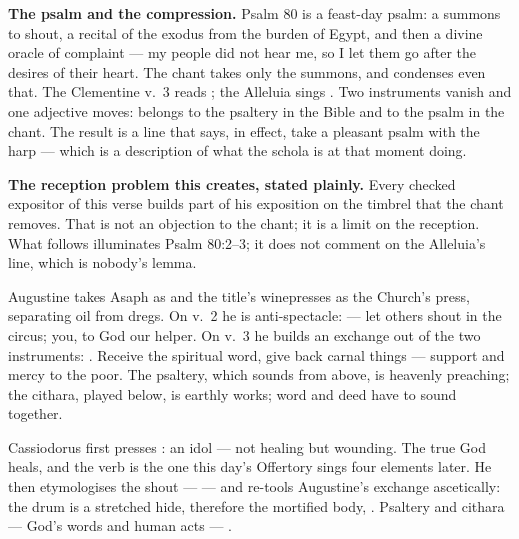 \textbf{The psalm and the compression.} Psalm 80 is a feast-day psalm: a
summons to shout, a recital of the exodus from the burden of Egypt, and then a
divine oracle of complaint --- my people did not hear me, so I let them go
after the desires of their heart. The chant takes only the summons, and
condenses even that. The Clementine v.~3 reads ; the Alleluia sings . Two instruments vanish and one adjective moves:
 belongs to the psaltery in the Bible and to the psalm in the
chant. The result is a line that says, in effect, take a pleasant psalm with
the harp --- which is a description of what the schola is at that moment doing.

\textbf{The reception problem this creates, stated plainly.} Every checked
expositor of this verse builds part of his exposition on the timbrel that the
chant removes. That is not an objection to the chant; it is a limit on the
reception. What follows illuminates Psalm 80:2--3; it does not comment on the
Alleluia's line, which is nobody's lemma.

\begin{witnessnote}
Augustine takes Asaph as  and the title's winepresses as the
Church's press, separating oil from dregs. On v.~2 he is anti-spectacle:
 --- let others shout in the circus; you,
to God our helper. On v.~3 he builds an exchange out of the two instruments:
. Receive the spiritual word, give back carnal things --- support
and mercy to the poor. The psaltery, which sounds from above, is heavenly
preaching; the cithara, played below, is earthly works; word and deed have to
sound together.
\end{witnessnote}

\begin{witnessnote}
Cassiodorus first presses : an idol  --- not healing but
wounding. The true God heals, and the verb is the one this day's Offertory
sings four elements later. He then etymologises the shout ---  --- and re-tools Augustine's exchange
ascetically: the drum is a stretched hide, therefore the mortified body,
. Psaltery and cithara --- God's words
and human acts --- .
\end{witnessnote}

